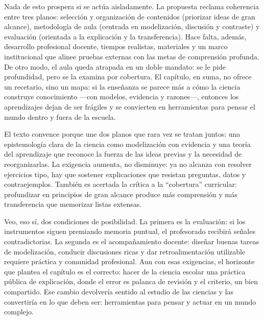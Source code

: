 \documentclass{article}
\begin{document}
\begin{tcolorbox}[enhanced,breakable,
  colback=white, colframe=black, boxrule=0.8pt,
  left=6mm,right=6mm,top=3mm,bottom=3mm,
  title={\large \textbf{Resumen narrativo}}]
Nada de esto prospera si se actúa aisladamente. La propuesta reclama coherencia entre tres planos: selección y organización de contenidos (priorizar ideas de gran alcance), metodología de aula (centrada en modelización, discusión y contraste) y evaluación (orientada a la explicación y la transferencia). Hace falta, además, desarrollo profesional docente, tiempos realistas, materiales y un marco institucional que alinee pruebas externas con las metas de comprensión profunda. De otro modo, el aula queda atrapada en un doble mandato: se le pide profundidad, pero se la examina por cobertura. El capítulo, en suma, no ofrece un recetario, sino un mapa: si la enseñanza se parece más a cómo la ciencia construye conocimiento —con modelos, evidencia y razones—, entonces los aprendizajes dejan de ser frágiles y se convierten en herramientas para pensar el mundo dentro y fuera de la escuela.

\end{tcolorbox}

\begin{tcolorbox}[enhanced,breakable,
  colback=white, colframe=black, boxrule=0.8pt,
  left=6mm,right=6mm,top=3mm,bottom=3mm,
  title={\large \textbf{Opinión personal}}]

El texto convence porque une dos planos que rara vez se tratan juntos: una epistemología clara de la ciencia como modelización con evidencia y una teoría del aprendizaje que reconoce la fuerza de las ideas previas y la necesidad de reorganizarlas. La exigencia aumenta, no disminuye: ya no alcanza con resolver ejercicios tipo, hay que sostener explicaciones que resistan preguntas, datos y contraejemplos. También es acertada la crítica a la “cobertura” curricular: profundizar en principios de gran alcance produce más comprensión y más transferencia que memorizar listas extensas.

Veo, eso sí, dos condiciones de posibilidad. La primera es la evaluación: si los instrumentos siguen premiando memoria puntual, el profesorado recibirá señales contradictorias. La segunda es el acompañamiento docente: diseñar buenas tareas de modelización, conducir discusiones ricas y dar retroalimentación utilizable requiere práctica y comunidad profesional. Aun con esas exigencias, el horizonte que plantea el capítulo es el correcto: hacer de la ciencia escolar una práctica pública de explicación, donde el error es palanca de revisión y el criterio, un bien compartido. Ese cambio devolvería sentido al estudio de las ciencias y las convertiría en lo que deben ser: herramientas para pensar y actuar en un mundo complejo.

\end{tcolorbox}
\end{document}

